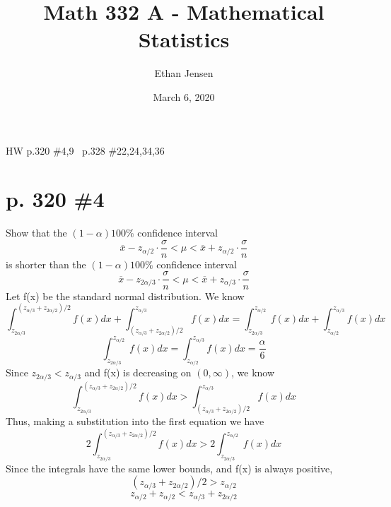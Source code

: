 \documentclass[12pt]{article}
\title{Math 332 A - Mathematical Statistics}
\author{Ethan Jensen}
\date{March 6, 2020}
\begin{document}
	\maketitle HW p.320 \#4,9 \ p.328 \#22,24,34,36
  \section[20pt]{p. 320 \#4}
  Show that the \((1-\alpha)100\%\) confidence interval
	\[\overline{x} - z_{\alpha/2}\cdot\frac{\sigma}{n}< \mu < \overline{x} + z_{\alpha/2}\cdot\frac{\sigma}{n}\]
	is shorter than the \((1-\alpha)100\%\) confidence interval
	\[\overline{x} - z_{2\alpha/3}\cdot\frac{\sigma}{n}< \mu < \overline{x} + z_{\alpha/3}\cdot\frac{\sigma}{n}\]
	\newline
	Let f(x) be the standard normal distribution. We know
	\[\int_{z_{2\alpha/3}}^{(z_{\alpha/3}+z_{2\alpha/2})/2}f(x) dx + \int_{(z_{\alpha/3}+z_{2\alpha/2})/2}^{z_{\alpha/3}} f(x) dx = \int_{z_{2\alpha/3}}^{z_{\alpha/2}} f(x) dx + \int_{z_{\alpha/2}}^{z_{\alpha/3}} f(x) dx\]
	\[\int_{z_{2\alpha/3}}^{z_{\alpha/2}} f(x) dx = \int_{z_{\alpha/2}}^{z_{\alpha/3}} f(x) dx = \frac{\alpha}{6}\]
	Since \(z_{2\alpha/3} < z_{\alpha/3}\) and f(x) is decreasing on \((0, \infty)\), we know
	\[\int_{z_{2\alpha/3}}^{(z_{\alpha/3}+z_{2\alpha/2})/2}f(x) dx > \int_{(z_{\alpha/3}+z_{2\alpha/2})/2}^{z_{\alpha/3}} f(x) dx\]
	Thus, making a substitution into the first equation we have
	\[2\int_{z_{2\alpha/3}}^{(z_{\alpha/3}+z_{2\alpha/2})/2}f(x) dx > 2\int_{z_{2\alpha/3}}^{z_{\alpha/2}} f(x) dx\]
	Since the integrals have the same lower bounds, and f(x) is always positive,
	\[(z_{\alpha/3}+z_{2\alpha/2})/2 > z_{\alpha/2}\]
	\[z_{\alpha/2} + z_{\alpha/2} < z_{\alpha/3}+z_{2\alpha/2}\]
	\newpage
\end{document}
